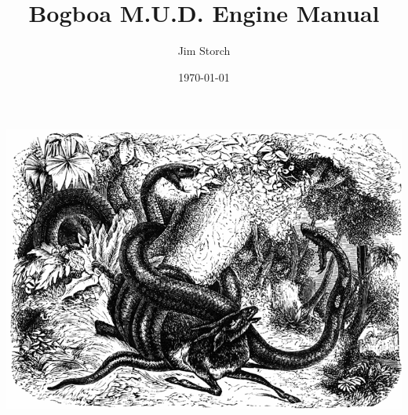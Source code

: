 \documentclass{report}
\begin{document}
\title{Bogboa M.U.D. Engine Manual}
\author{Jim Storch}
\date{\today}
\maketitle

\begin{center}
\includegraphics[scale=0.5]{illustrations/boa.png}
\end{center}

\tableofcontents





\end{document}
